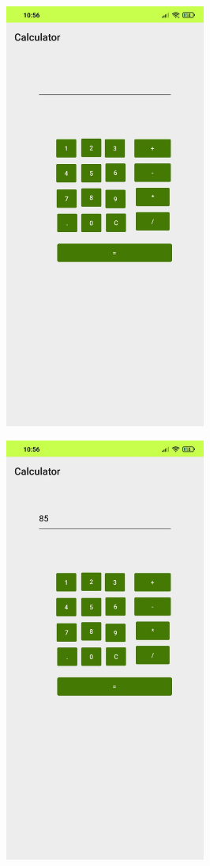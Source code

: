 \documentclass[12pt,letterpaper]{article}
\begin{document}
\subsection*{}
\begin{figure}[h]
    \centering
    \includegraphics[height=14cm, keepaspectratio]{Calculator/Outputs/OP1.png}
\end{figure}
\begin{figure}
    \centering
    \includegraphics[height=14cm, keepaspectratio]{Calculator/Outputs/OP2.png}
\end{figure}
\end{document}
